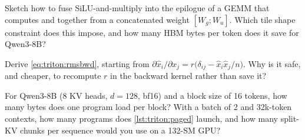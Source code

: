 \begin{exercise}
Sketch how to fuse SiLU-and-multiply into the epilogue of a GEMM that computes
 and  together from a concatenated weight $[W_g;W_u]$. Which tile
shape constraint does this impose, and how many HBM bytes per token does it save for
Qwen3-8B?
\end{exercise}
\begin{exercise}
Derive \cref{eq:triton:rmsbwd}, starting from
$\partial\hat x_i/\partial x_j=r\big(\delta_{ij}-\hat x_i\hat x_j/n\big)$. Why is it
safe, and cheaper, to recompute $r$ in the backward kernel rather than save it?
\end{exercise}
\begin{exercise}
For Qwen3-8B (8 KV heads, $d=128$, bf16) and a block size of 16 tokens, how many bytes
does one program load per block? With a batch of 2 and 32k-token contexts, how many
programs does \cref{lst:triton:paged} launch, and how many split-KV chunks per sequence
would you use on a 132-SM GPU?
\end{exercise}
